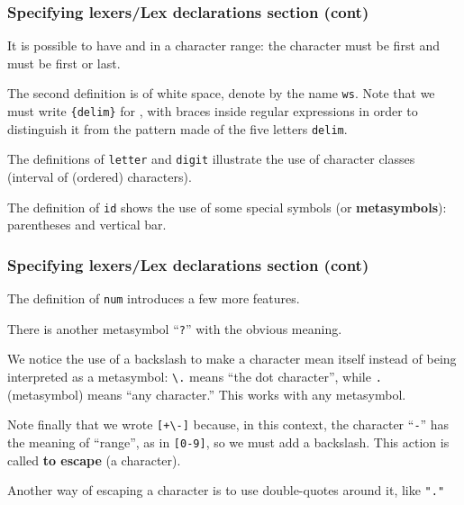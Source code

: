 % 
\begin{frame}[containsverbatim]
\frametitle{Specifying lexers/Lex declarations section
(cont)}
 
It is possible to have \exc{]} and \exc{-} in a character range: the
character \exc{]} must be first and \exc{-} must be first or last.

\bigskip

The second definition is of white space, denote by the name
\texttt{ws}. Note that we must write \verb+{delim}+ for ,
with braces inside regular expressions in order to distinguish it from
the pattern made of the five letters \verb+delim+.

\bigskip

The definitions of \texttt{letter} and \texttt{digit} illustrate the
use of character classes (interval of (ordered) characters).

\bigskip

The definition of \texttt{id} shows the use of some \Lex special
symbols (or \textbf{metasymbols}): parentheses and vertical bar.

\end{frame}

% 
\begin{frame}[containsverbatim]
\frametitle{Specifying lexers/Lex declarations section
(cont)}
 
The definition of \texttt{num} introduces a few more features. 

\bigskip

There is another metasymbol ``\verb+?+'' with the obvious meaning. 

\bigskip

We notice the use of a backslash to make a character mean itself
instead of being interpreted as a metasymbol: \verb+\.+ means ``the dot
character'', while \verb+.+ (metasymbol) means ``any character.'' This
works with any metasymbol.

\bigskip

Note finally that we wrote \verb|[+\-]| because, in this context, the
character ``\verb|-|'' has the meaning of ``range'', as in \verb+[0-9]+,
so we must add a backslash. This action is called \textbf{to
escape} (a character).

\bigskip

Another way of escaping a character is to use double-quotes around it,
like \verb+"."+

\end{frame}


